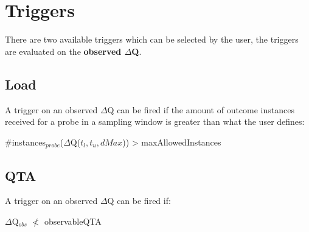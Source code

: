 \section{Triggers}
    There are two available triggers which can be selected by the user, the triggers are evaluated on the \textbf{observed $\Delta$Q}.
    \subsection{Load}
        A trigger on an observed $\Delta$Q can be fired if the amount of outcome instances received for a probe in a sampling window is greater than what the user defines:
    \begin{center}
        \#instances$_{probe}$($\Delta$Q($t_l, t_u, dMax$)) > maxAllowedInstances 
    \end{center}

    \subsection{QTA}
        A trigger on an observed $\Delta$Q can be fired if:
        \begin{center}
            $\Delta$Q$_{obs}$ $\nless$ observableQTA
        \end{center}
